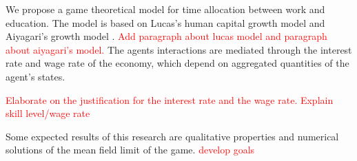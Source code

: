 We propose a game theoretical model for time allocation between work and education.
The model is based on Lucas's human capital growth model \cite{lucas1988mechanics} and Aiyagari’s growth model \cite{achdou2014partial,carmona2018probabilistic}.
\textcolor{red}{Add paragraph about lucas model and paragraph about aiyagari's model.}
The agents interactions are mediated through the interest rate and wage rate of the economy, which depend on aggregated quantities of the agent's states.

\textcolor{red}{Elaborate on the justification for the interest rate and the wage rate.
Explain skill level/wage rate}

Some expected results of this research are qualitative properties and numerical solutions of the mean field limit of the game. \textcolor{red}{develop goals}


